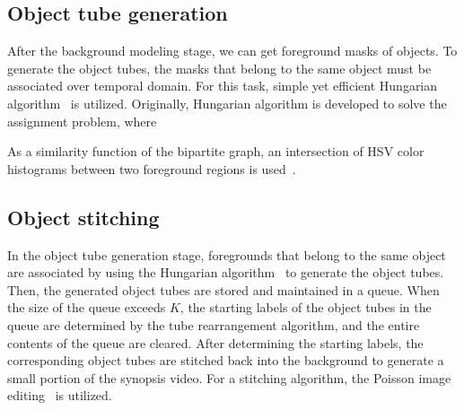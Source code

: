 \documentclass[11pt]{hyu_thesis}
\begin{document}
\subsection{Object tube generation}
After the background modeling stage, we can get foreground masks of objects. To generate the object tubes, the masks that belong to the same object must be associated over temporal domain. For this task, simple yet efficient Hungarian algorithm~\cite{Kuhn1955} is utilized. Originally, Hungarian algorithm is developed to solve the assignment problem, where 


As a similarity function of the bipartite graph, an intersection of HSV color histograms between two foreground regions is used~\cite{perez2002color}. 

\subsection{Object stitching}
In the object tube generation stage, foregrounds that belong to the same object are associated by using the Hungarian algorithm~\cite{Kuhn1955} to generate the object tubes. Then, the generated object tubes are stored and maintained in a queue. When the size of the queue exceeds $K$, the starting labels of the object tubes in the queue are determined by the tube rearrangement algorithm, and the entire contents of the queue are cleared. After determining the starting labels, the corresponding object tubes are stitched back into the background to generate a small portion of the synopsis video. For a stitching algorithm, the Poisson image editing~\cite{Perez2003} is utilized. 
\end{document}
